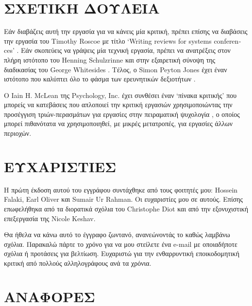 \documentclass{article}
\begin{document}
\section{ΣΧΕΤΙΚΗ ΔΟΥΛΕΙΑ}
\par
Εάν διαβάζεις αυτή την εργασία για να κάνεις μία κριτική, πρέπει επίσης να διαβάσεις την εργασία του \textlatin{Timothy Roscoe} με τίτλο \textlatin{\enquote*{Writing reviews for systems conferences}} \cite{3writingReviewsForSystemsConferences}. Εάν σκοπεύεις να γράψεις μία τεχνική εργασία, πρέπει να ανατρέξεις στον πλήρη ιστότοπο του \textlatin{Henning Schulzrinne} \cite{4writingTechnicalArticles} και στην εξαιρετική σύνοψη της διαδικασίας του \textlatin{George Whitesides} \cite{5whitesidesGroupWritingAPaper}. Τέλος, ο \textlatin{Simon Peyton Jones} έχει έναν ιστότοπο που καλύπτει όλο το φάσμα των ερευνητικών δεξιοτήτων \cite{2researchSkills}.
\par
Ο \textlatin{Iain H. McLean} της \textlatin{Psychology, Inc.} έχει συνθέσει έναν \textquoteleft πίνακα κριτικής\textlatin{'} που μπορείς να κατεβάσεις που απλοποιεί την κριτική εργασιών χρησιμοποιώντας την προσέγγιση τριών-περασμάτων για εργασίες στην πειραματική ψυχολογία \cite{1literatureReviewMatrix}, ο οποίος μπορεί πιθανότατα να χρησιμοποιηθεί, με μικρές μετατροπές, για εργασίες άλλων περιοχών.
\section{ΕΥΧΑΡΙΣΤΙΕΣ}
\par
Η πρώτη έκδοση αυτού του εγγράφου συντάχθηκε από τους φοιτητές μου: \textlatin{Hossein Falaki}, \textlatin{Earl Oliver} και \textlatin{Sumair Ur Rahman}. Οι ευχαριστίες μου σε αυτούς. Επίσης επωφελήθηκα από τα διορατικά σχόλια του \textlatin{Christophe Diot} και από την εξονυχιστική επεξεργασία της \textlatin{Nicole Keshav}.
\par
Θα ήθελα να κάνω αυτό το έγγραφο ζωντανό, ανανεώνοντάς το καθώς λαμβάνω σχόλια. Παρακαλώ πάρτε το χρόνο για να μου στείλετε ένα \textlatin{e-mail} με οποιαδήποτε σχόλια ή προτάσεις για βελτίωση. Ευχαριστώ για την ενθαρρυντική εποικοδομητική κριτική από πολλούς αλληλογράφους ανά τα χρόνια.

\section*{ΑΝΑΦΟΡΕΣ}

\end{document}
